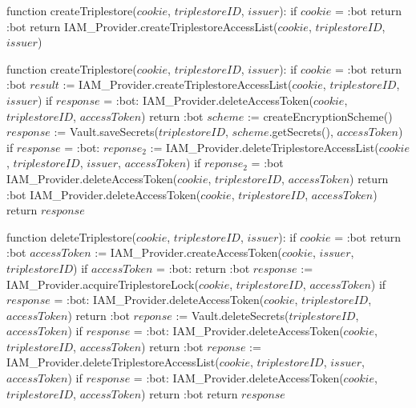 function createTriplestore($cookie$, $triplestoreID$, $issuer$):
    if $cookie$ = :bot
        return :bot
    return IAM_Provider.createTriplestoreAccessList($cookie$, $triplestoreID$, $issuer$)

function createTriplestore($cookie$, $triplestoreID$, $issuer$):
    if $cookie$ = :bot
        return :bot
    $result$ := IAM_Provider.createTriplestoreAccessList($cookie$, $triplestoreID$, $issuer$)
    if $response$ = :bot: 
        IAM_Provider.deleteAccessToken($cookie$, $triplestoreID$, $accessToken$)
        return :bot
    $scheme$ := createEncryptionScheme() 
    $response$ := Vault.saveSecrets($triplestoreID$, $scheme$.getSecrets(), $accessToken$)
    if $response$ = :bot:
        $reponse_2$ := IAM_Provider.deleteTriplestoreAccessList($cookie$, $triplestoreID$, $issuer$, $accessToken$)
        if $reponse_2$ = :bot
            IAM_Provider.deleteAccessToken($cookie$, $triplestoreID$, $accessToken$)
        return :bot
    IAM_Provider.deleteAccessToken($cookie$, $triplestoreID$, $accessToken$)
    return $response$

function deleteTriplestore($cookie$, $triplestoreID$, $issuer$):
    if $cookie$ = :bot
        return :bot
    $accessToken$ := IAM_Provider.createAccessToken($cookie$, $issuer$, $triplestoreID$)
    if $accessToken$ = :bot:
        return :bot
    $response$ := IAM_Provider.acquireTriplestoreLock($cookie$, $triplestoreID$, $accessToken$)
    if $response$ = :bot: 
        IAM_Provider.deleteAccessToken($cookie$, $triplestoreID$, $accessToken$)
        return :bot
    $reponse$ := Vault.deleteSecrets($triplestoreID$, $accessToken$)
    if $response$ = :bot: 
        IAM_Provider.deleteAccessToken($cookie$, $triplestoreID$, $accessToken$)
        return :bot
    $reponse$ := IAM_Provider.deleteTriplestoreAccessList($cookie$, $triplestoreID$, $issuer$, $accessToken$)
    if $response$ = :bot: 
        IAM_Provider.deleteAccessToken($cookie$, $triplestoreID$, $accessToken$)
        return :bot
    return $response$